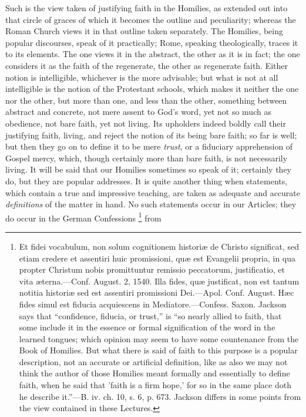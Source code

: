 Such is the view taken of justifying faith in the Homilies, as
extended out into that circle of graces of which it becomes the
outline and peculiarity; whereas the Roman Church views it in that
outline taken separately. The Homilies, being popular discourses,
speak of it practically; Rome, speaking theologically, traces it to
its elements. The one views it in the abstract, the other as it is in
fact; the one considers it as the faith of the regenerate, the other
as regenerate faith. Either notion is intelligible, whichever is the
more advisable; but what is not at all intelligible is the notion of
the Protestant schools, which makes it neither the one nor the other,
but more than one, and less than the other, something between abstract
and concrete, not mere assent to God's word, yet not so much as
obedience, not bare faith, yet not living. Its upholders indeed boldly
call their justifying faith, living, and reject the notion of its
being bare faith; so far is well; but then they go on to define it to
be mere \emph{trust}, or a fiduciary apprehension of Gospel mercy,
which, though certainly more than bare faith, is not necessarily
living. It will be said that our Homilies sometimes so speak of it;
certainly they do, but they are popular addresses. It is quite another
thing when statements, which contain a true and impressive teaching,
are taken as adequate and accurate \emph{definitions} of the matter in
hand. No such statements occur in our Articles; they do occur in the
German Confessions \footnote{Et fidei
vocabulum, non solum cognitionem historiæ de Christo significat, sed
etiam credere et assentiri huic promissioni, quæ est Evangelii
propria, in qua propter Christum nobis promittuntur remissio
peccatorum, justificatio, et vita æterna.—Conf. August. 2, 1540.
Illa fides, quæ justificat, non est tantum notitia historiæ sed est
assentiri promissioni Dei.—Apol. Conf. August. Hæc fides simul est
fiducia acquiescens in Mediatore.—Confess. Saxon. Jackson says that
``confidence, fiducia, or trust,'' is ``so nearly allied
to faith, that some include it in the essence or formal signification
of the word in the learned tongues; which opinion may seem to have
some countenance from the Book of Homilies. But what there is said of
faith to this purpose is a popular description, not an accurate or
artificial definition, like as also we may not think the author of
those Homilies meant formally and essentially to define faith, when he
said that 'faith is a firm hope,' for so in the same place doth he
describe it.''—B. iv. ch. 10, s. 6, p. 673. Jackson differs in
some points from the view contained in these Lectures.} from

